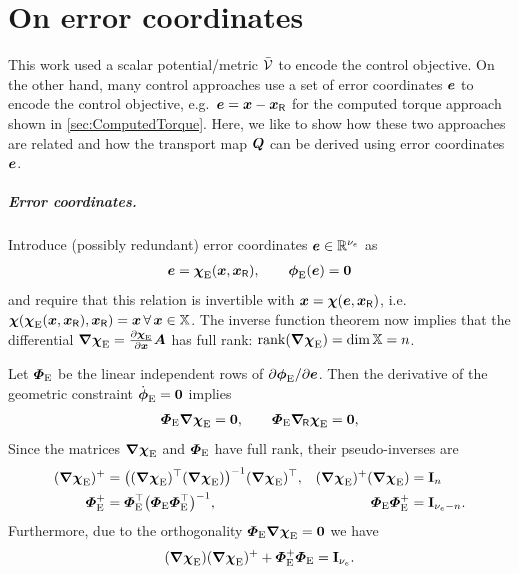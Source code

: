 \chapter{On error coordinates}

This work used a scalar potential/metric $\potentialEnergyC$ to encode the control objective.
On the other hand, many control approaches use a set of error coordinates $\sysCoordE$ to encode the control objective, e.g.\ $\sysCoordE = \sysCoord - \sysCoordR$ for the computed torque approach shown in \autoref{sec:ComputedTorque}.
Here, we like to show how these two approaches are related and how the transport map $\sysTransportMap$ can be derived using error coordinates $\sysCoordE$.

\paragraph{Error coordinates.}
Introduce (possibly redundant) error coordinates $\sysCoordE \in \RealNum^{\numCoordE}$ as
\begin{align}
 \sysCoordE = \sysCoordFktE(\sysCoord, \sysCoordR), \qquad \geoConstraintE(\sysCoordE) = \tuple{0}
\end{align}
and require that this relation is invertible with $\sysCoord = \sysCoordFkt(\sysCoordE, \sysCoordR)$, i.e.\ $\sysCoordFkt(\sysCoordFktE(\sysCoord, \sysCoordR), \sysCoordR) = \sysCoord \, \forall \, \sysCoord \in \configSpace$.
The inverse function theorem now implies that the differential $\differential \sysCoordFktE = \pdiff[\sysCoordFktE]{\sysCoord} \kinMat $ has full rank: $\rank(\differential \sysCoordFktE) = \dim \configSpace = \dimConfigSpace$.

Let $\geoConstraintMatE$ be the linear independent rows of $\spdiff[\geoConstraintE]{\sysCoordE}$.
Then the derivative of the geometric constraint $\geoConstraintEd = \tuple{0}$ implies
\begin{align}
 \geoConstraintMatE \differential \sysCoordFktE = \tuple{0},
\qquad
 \geoConstraintMatE \differentialR \sysCoordFktE = \tuple{0},
\end{align}
Since the matrices $\differential \sysCoordFktE$ and $\geoConstraintMatE$ have full rank, their pseudo-inverses are
\begin{align}
 (\differential \sysCoordFktE)^+ &= \big( (\differential \sysCoordFktE)^\top (\differential \sysCoordFktE) \big)^{-1} (\differential \sysCoordFktE)^\top,&
 (\differential \sysCoordFktE)^+ (\differential \sysCoordFktE) &= \idMat[\dimConfigSpace]
\\
 \geoConstraintMatE^+ &= \geoConstraintMatE^\top \big( \geoConstraintMatE \geoConstraintMatE^\top \big)^{-1},&
 \geoConstraintMatE \geoConstraintMatE^+ &= \idMat[\numCoordE - \dimConfigSpace].
\end{align}
Furthermore, due to the orthogonality $\geoConstraintMatE \differential \sysCoordFktE = \tuple{0}$ we have
\begin{align}
 (\differential \sysCoordFktE) (\differential \sysCoordFktE)^+ + \geoConstraintMatE^+ \geoConstraintMatE = \idMat[\numCoordE].
\end{align}

